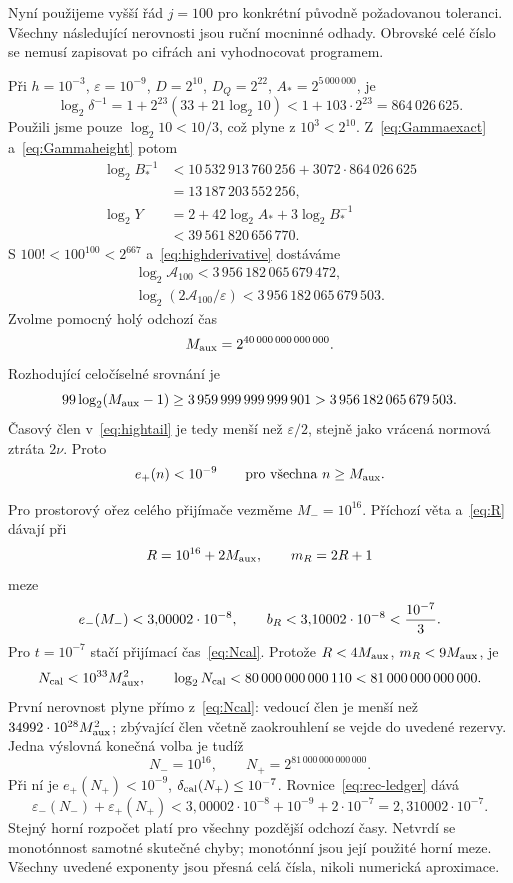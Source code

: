 \documentclass[11pt,a4paper]{article}
\newcommand{\eps}{\varepsilon}
\theoremstyle{remark}\newtheorem{remark}[theorem]{Poznámka}
\numberwithin{equation}{section}
\begin{document}
Nyní použijeme vyšší řád \(j=100\) pro konkrétní původně požadovanou toleranci. Všechny následující nerovnosti jsou ruční mocninné odhady. Obrovské celé číslo se nemusí zapisovat po cifrách ani vyhodnocovat programem.

Při \(h=10^{-3}\), \(\varepsilon=10^{-9}\), \(D=2^{10}\), \(D_Q=2^{22}\), \(A_*=2^{5\,000\,000}\), je
\[
\log_2\delta^{-1}
=1+2^{23}(33+21\log_2 10)
<1+103\cdot2^{23}=864\,026\,625.
\]
Použili jsme pouze \(\log_2 10<10/3\), což plyne z \(10^3<2^{10}\). Z~\eqref{eq:Gammaexact} a~\eqref{eq:Gammaheight} potom
\begin{align*}
\log_2B_*^{-1}
&<10\,532\,913\,760\,256+3072\cdot864\,026\,625\\
&=13\,187\,203\,552\,256,\\
\log_2Y
&=2+42\log_2A_*+3\log_2B_*^{-1}\\
&<39\,561\,820\,656\,770.
\end{align*}
S \(100!<100^{100}<2^{667}\) a~\eqref{eq:highderivative} dostáváme
\begin{gather*}
\log_2\mathcal A_{100}<3\,956\,182\,065\,679\,472,\\
\log_2(2\mathcal A_{100}/\varepsilon)
<3\,956\,182\,065\,679\,503.
\end{gather*}
Zvolme pomocný holý odchozí čas
\[
M_{\rm aux}=2^{40\,000\,000\,000\,000}.
\]
Rozhodující celočíselné srovnání je
\[
99\log_2(M_{\rm aux}-1)
\ge3\,959\,999\,999\,999\,901
>3\,956\,182\,065\,679\,503.
\]
Časový člen v~\eqref{eq:hightail} je tedy menší než \(\varepsilon/2\), stejně jako vrácená normová ztráta \(2\nu\). Proto
\[
e_+(n)<10^{-9}\qquad\text{pro všechna }n\ge M_{\rm aux}.
\]

Pro prostorový ořez celého přijímače vezměme \(M_-=10^{16}\). Příchozí věta a~\eqref{eq:R} dávají při
\[
R=10^{16}+2M_{\rm aux},\qquad m_R=2R+1
\]
meze
\[
e_-(M_-)<3{,}00002\cdot10^{-8},\qquad
b_R<3{,}10002\cdot10^{-8}<{10^{-7}\over3}.
\]
Pro \(t=10^{-7}\) stačí přijímací čas~\eqref{eq:Ncal}. Protože
\(R<4M_{\rm aux}\), \(m_R<9M_{\rm aux}\), je
\[
N_{\rm cal}<10^{33}M_{\rm aux}^2,
\qquad
\log_2N_{\rm cal}<80\,000\,000\,000\,110
<81\,000\,000\,000\,000.
\]
První nerovnost plyne přímo z~\eqref{eq:Ncal}: vedoucí člen je menší než \(34992\cdot10^{28}M_{\rm aux}^2\); zbývající člen včetně zaokrouhlení se vejde do uvedené rezervy. Jedna výslovná konečná volba je tudíž
\begin{equation}
\boxed{N_-=10^{16},\qquad N_+=2^{81\,000\,000\,000\,000}.}
\label{eq:finaltimes}
\end{equation}
Při ní je \(e_+(N_+)<10^{-9}\), \(\delta_{\rm cal}(N_+)\le10^{-7}\). Rovnice~\eqref{eq:rec-ledger} dává
\begin{equation}
\boxed{\eps_-(N_-)+\eps_+(N_+)
<3{,}00002\cdot10^{-8}+10^{-9}+2\cdot10^{-7}
=2{,}310002\cdot10^{-7}.}
\label{eq:completebudget}
\end{equation}
Stejný horní rozpočet platí pro všechny pozdější odchozí časy. Netvrdí se monotónnost samotné skutečné chyby; monotónní jsou její použité horní meze. Všechny uvedené exponenty jsou přesná celá čísla, nikoli numerická aproximace.
\end{document}

